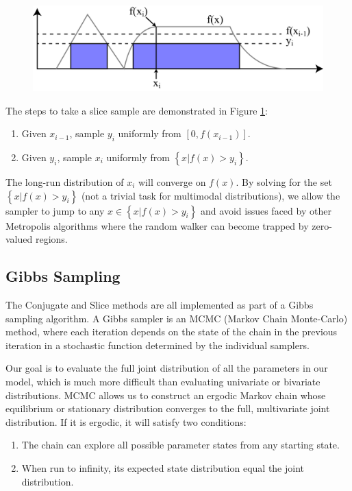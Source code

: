\documentclass[a4paper, 12pt]{article}
\begin{document}
\begin{figure}
  \centering
  \includegraphics[width=0.5\linewidth]{media/slice_sampling}
  \label{fig:slice_sampling}
\end{figure}

The steps to take a slice sample are demonstrated in Figure \ref{fig:slice_sampling}:

\begin{enumerate}
\item Given $x_{i-1}$, sample $y_i$ uniformly from $[0, f(x_{i-1})]$.
\item Given $y_i$, sample $x_i$ uniformly from $\left\{ x | f(x) > y_i \right\}$.
\end{enumerate}

The long-run distribution of $x_i$ will converge on $f(x)$. By solving for the set $\left\{ x | f(x) > y_i \right\}$ (not a trivial task for multimodal distributions), we allow the sampler to jump to any $x\in \left\{ x | f(x) > y_i \right\}$ and avoid issues faced by other Metropolis algorithms where the random walker can become trapped by zero-valued regions.

\subsection{Gibbs Sampling} \label{sec:gibbs}
The Conjugate and Slice methods are all implemented as part of a Gibbs sampling algorithm. A Gibbs sampler is an MCMC (Markov Chain Monte-Carlo) method, where each iteration depends on the state of the chain in the previous iteration in a stochastic function determined by the individual samplers.

Our goal is to evaluate the full joint distribution of all the parameters in our model, which is much more difficult than evaluating univariate or bivariate distributions. MCMC allows us to construct an ergodic Markov chain whose equilibrium or stationary distribution converges to the full, multivariate joint distribution. If it is ergodic, it will satisfy two conditions:

\begin{enumerate}
\item The chain can explore all possible parameter states from any starting state.
\item When run to infinity, its expected state distribution equal the joint distribution.
\end{enumerate}
\end{document}
